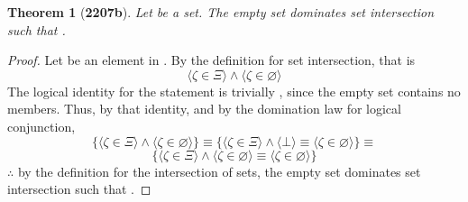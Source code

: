 \documentclass[preview]{standalone}
\newtheorem*{theorem*}{Theorem}
\begin{document}
\begin{theorem*}[\textbf{2207b}] \color{black}
    Let \bm{$\Xi$} be a set. 
    The empty set dominates set intersection such that 
    \bm{$\Xi \cap \varnothing = \varnothing$}.
\end{theorem*}
\begin{proof} \color{black}
    Let \bm{$\zeta$} be an element in \bm{$\Xi \cap \varnothing$}. 
    By the definition for set intersection, that is 
    \begin{equation*}
        \Big \langle \zeta \in \Xi \Big \rangle 
            \land 
        \Big \langle \zeta \in \varnothing \Big \rangle
    \end{equation*}
    The logical identity for the statement \bm{$\zeta \in \varnothing$} is trivially \bm{$\bot$}, 
    since the empty set contains no members. 
    Thus, by that identity, 
    and by the domination law for logical conjunction,
    \begin{equation*}
        \Bigg\{
            \Big \langle \zeta \in \Xi \Big \rangle 
                \land 
            \Big \langle \zeta \in \varnothing \Big \rangle
        \Bigg\}
            \equiv
        \Bigg\{
            \Big \langle \zeta \in \Xi \Big \rangle 
                \land 
            \Big \langle \bot \Big \rangle
                \equiv
            \Big \langle \zeta \in \varnothing \Big \rangle
        \Bigg\}
            \equiv
    \end{equation*}
    \begin{equation*}
        \Bigg\{
            \Big \langle \zeta \in \Xi \Big \rangle 
                \land 
            \Big \langle \zeta \in \varnothing \Big \rangle
                \equiv
            \Big \langle \zeta \in \varnothing \Big \rangle
        \Bigg\}
    \end{equation*}
    $\therefore$ by the definition for the intersection of sets,
    the empty set dominates set intersection such that 
    \bm{$\Xi \cap \varnothing = \varnothing$}.
\color{lightgray} \end{proof}
\end{document}
